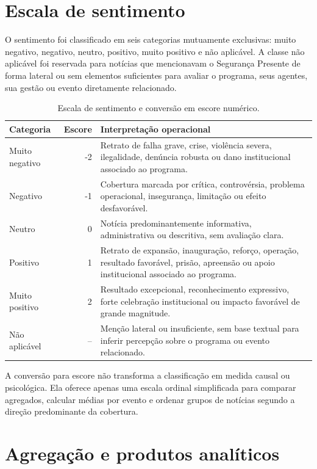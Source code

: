 \documentclass[12pt,a4paper]{article}
\begin{document}
\section{Escala de sentimento}

O sentimento foi classificado em seis categorias mutuamente exclusivas: muito negativo, negativo, neutro, positivo, muito positivo e não aplicável. A classe não aplicável foi reservada para notícias que mencionavam o Segurança Presente de forma lateral ou sem elementos suficientes para avaliar o programa, seus agentes, sua gestão ou evento diretamente relacionado.

\begin{table}[H]
\centering
\begin{tabular}{p{4cm}rp{8cm}}
\toprule
\textbf{Categoria} & \textbf{Escore} & \textbf{Interpretação operacional} \\
\midrule
Muito negativo & -2 & Retrato de falha grave, crise, violência severa, ilegalidade, denúncia robusta ou dano institucional associado ao programa. \\
Negativo & -1 & Cobertura marcada por crítica, controvérsia, problema operacional, insegurança, limitação ou efeito desfavorável. \\
Neutro & 0 & Notícia predominantemente informativa, administrativa ou descritiva, sem avaliação clara. \\
Positivo & 1 & Retrato de expansão, inauguração, reforço, operação, resultado favorável, prisão, apreensão ou apoio institucional associado ao programa. \\
Muito positivo & 2 & Resultado excepcional, reconhecimento expressivo, forte celebração institucional ou impacto favorável de grande magnitude. \\
Não aplicável & -- & Menção lateral ou insuficiente, sem base textual para inferir percepção sobre o programa ou evento relacionado. \\
\bottomrule
\end{tabular}
\caption{Escala de sentimento e conversão em escore numérico.}
\end{table}

A conversão para escore não transforma a classificação em medida causal ou psicológica. Ela oferece apenas uma escala ordinal simplificada para comparar agregados, calcular médias por evento e ordenar grupos de notícias segundo a direção predominante da cobertura.

\section{Agregação e produtos analíticos}
\end{document}
